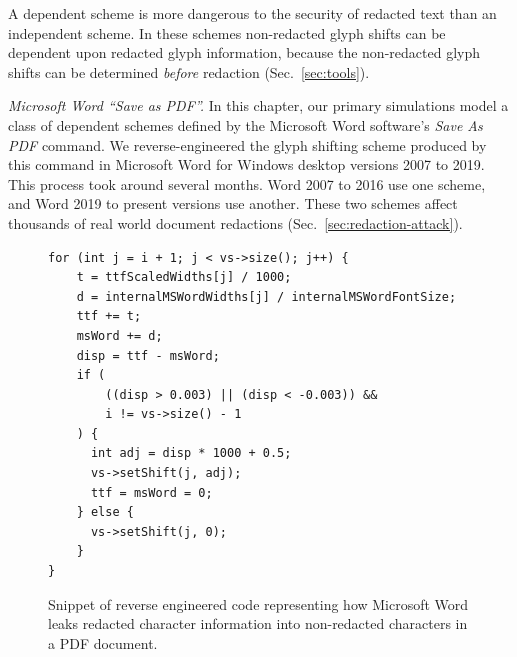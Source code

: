 A dependent scheme is more dangerous to the security of redacted text than an independent scheme.
In these schemes non-redacted glyph shifts can be dependent upon redacted glyph information, because the non-redacted glyph shifts can be determined \emph{before} redaction (Sec.~\ref{sec:tools}).

\emph{Microsoft Word ``Save as PDF''.}
In this chapter, our primary simulations model a class of dependent schemes defined by the Microsoft Word software's \emph{Save As PDF} command.
We reverse-engineered the glyph shifting scheme produced by this command in Microsoft Word for Windows desktop versions 2007 to 2019.
This process took around several months. 
Word 2007 to 2016 use one scheme, and Word 2019 to present versions use another.
These two schemes affect thousands of real world document redactions (Sec.~\ref{sec:redaction-attack}).


\begin{figure}
\begin{lstlisting}
for (int j = i + 1; j < vs->size(); j++) {
    t = ttfScaledWidths[j] / 1000;
    d = internalMSWordWidths[j] / internalMSWordFontSize;
    ttf += t;
    msWord += d;
    disp = ttf - msWord;
    if (
        ((disp > 0.003) || (disp < -0.003)) && 
        i != vs->size() - 1
    ) {
      int adj = disp * 1000 + 0.5;
      vs->setShift(j, adj);
      ttf = msWord = 0;
    } else {
      vs->setShift(j, 0);
    }
}
\end{lstlisting}
\caption{Snippet of reverse engineered code representing how Microsoft Word leaks redacted character information into non-redacted characters in a PDF document.
    }
\label{fig:msword-snippet}
\end{figure}


